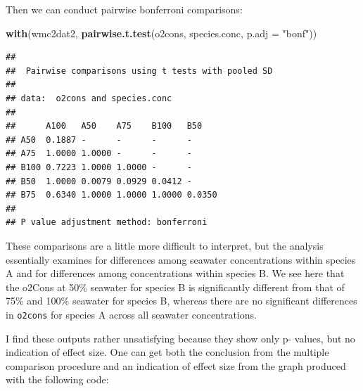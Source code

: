 \documentclass[
  12pt,
]{book}
\newenvironment{Shaded}{\begin{snugshade}}{\end{snugshade}}
\newcommand{\DataTypeTok}[1]{\textcolor[rgb]{0.13,0.29,0.53}{#1}}
\newcommand{\KeywordTok}[1]{\textcolor[rgb]{0.13,0.29,0.53}{\textbf{#1}}}
\newcommand{\NormalTok}[1]{#1}
\newcommand{\OperatorTok}[1]{\textcolor[rgb]{0.81,0.36,0.00}{\textbf{#1}}}
\newcommand{\StringTok}[1]{\textcolor[rgb]{0.31,0.60,0.02}{#1}}
\begin{document}
\begin{Shaded}
\end{Shaded}

Then we can conduct pairwise bonferroni comparisons:

\begin{Shaded}
\begin{Highlighting}[]
\KeywordTok{with}\NormalTok{(wmc2dat2, }\KeywordTok{pairwise.t.test}\NormalTok{(o2cons, species.conc, }\DataTypeTok{p.adj =} \StringTok{"bonf"}\NormalTok{))}
\end{Highlighting}
\end{Shaded}

\begin{verbatim}
## 
##  Pairwise comparisons using t tests with pooled SD 
## 
## data:  o2cons and species.conc 
## 
##      A100   A50    A75    B100   B50   
## A50  0.1887 -      -      -      -     
## A75  1.0000 1.0000 -      -      -     
## B100 0.7223 1.0000 1.0000 -      -     
## B50  1.0000 0.0079 0.0929 0.0412 -     
## B75  0.6340 1.0000 1.0000 1.0000 0.0350
## 
## P value adjustment method: bonferroni
\end{verbatim}

These comparisons are a little more difficult to interpret, but the analysis essentially examines for differences among seawater concentrations within species A and for differences among concentrations within species B. We see here that the o2Cons at 50\% seawater for species B is significantly different from that of 75\% and 100\% seawater for species B, whereas there are no significant differences in \texttt{o2cons} for species A across all seawater concentrations.

I find these outputs rather unsatisfying because they show only p- values, but no indication of effect size. One can get both the conclusion from the multiple comparison procedure and an indication of effect size from the graph produced with the following code:
\end{document}
